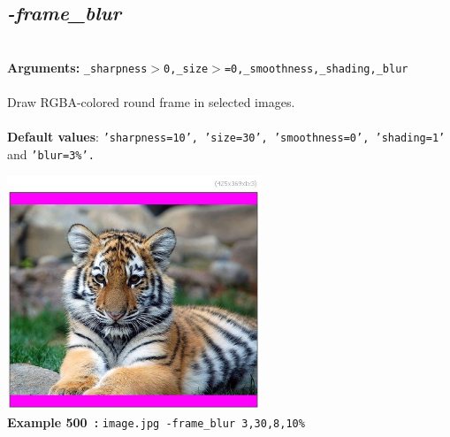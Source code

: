 \documentclass[a4paper,11pt,twoside]{book}
\begin{document}
\subsection{\emph{-frame\_blur} }\vspace*{-0.5em}
~\\\textbf{Arguments: } 
{\small \texttt{\_sharpness$>$0,\_size$>$=0,\_smoothness,\_shading,\_blur}}\\~\\
Draw RGBA-colored round frame in selected images.
~\\~\\\textbf{Default values}: {\small \texttt{'sharpness=10', 'size=30', 'smoothness=0', 'shading=1'} and \texttt{'blur=3\%'.}}
\begin{center}\includegraphics[keepaspectratio=true,height=7cm,width=\textwidth]{img/gmic_def500.jpg}\\
{\footnotesize \textbf{Example 500~:} \texttt{image.jpg -frame\_blur 3,30,8,10\%}}
\end{center}
\end{document}
